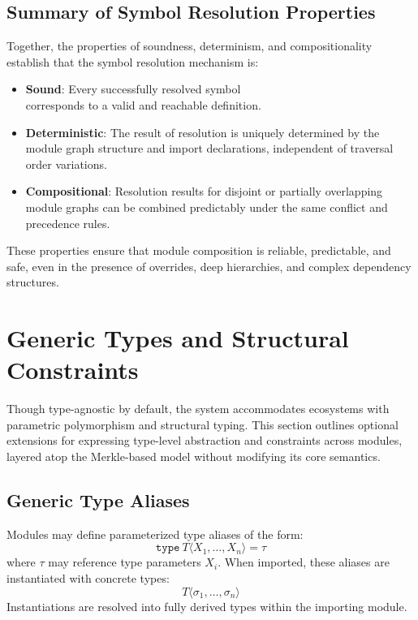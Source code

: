 \documentclass[sigplan,screen]{acmart}
\begin{document}
\subsection{Summary of Symbol Resolution Properties}
\label{sec:symbol-resolution}

Together, the properties of soundness, determinism, and compositionality establish that the symbol resolution mechanism is:
\begin{itemize}
    \item \textbf{Sound}: Every successfully resolved symbol \\corresponds to a valid and reachable definition.
    \item \textbf{Deterministic}: The result of resolution is uniquely determined by the module graph structure and import declarations, independent of traversal order variations.
    \item \textbf{Compositional}: Resolution results for disjoint or partially overlapping module graphs can be combined predictably under the same conflict and precedence rules.
\end{itemize}

These properties ensure that module composition is reliable, predictable, and safe, even in the presence of overrides, deep hierarchies, and complex dependency structures.

\section{Generic Types and Structural Constraints}
\label{appendix:generics}

Though type-agnostic by default, the system accommodates ecosystems with parametric polymorphism and structural typing. This section outlines optional extensions for expressing type-level abstraction and constraints across modules, layered atop the Merkle-based model without modifying its core semantics.

\subsection{Generic Type Aliases}

Modules may define parameterized type aliases of the form:
\[
\texttt{type}~T\langle X_1, \ldots, X_n \rangle = \tau
\]
where $\tau$ may reference type parameters $X_i$. When imported, these aliases are instantiated with concrete types:
\[
T\langle \sigma_1, \ldots, \sigma_n \rangle
\]
Instantiations are resolved into fully derived types within the importing module.
\end{document}
